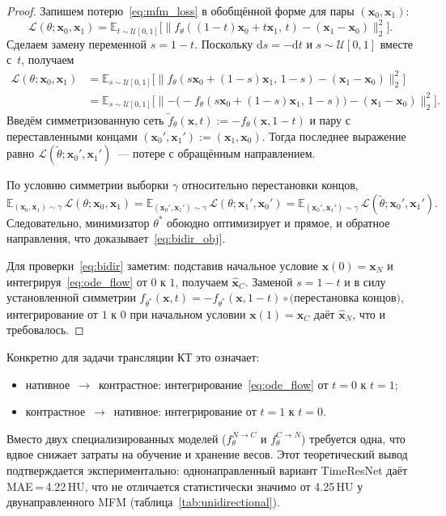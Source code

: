 \begin{proof}
Запишем потерю~\eqref{eq:mfm_loss} в обобщённой форме для пары $(\mathbf{x}_0,\mathbf{x}_1)$:
\[
    \mathcal{L}(\theta;\mathbf{x}_0,\mathbf{x}_1) = \mathbb{E}_{t\sim\mathcal{U}[0,1]}\bigl[\lVert f_\theta((1-t)\mathbf{x}_0+t\mathbf{x}_1,\,t)-(\mathbf{x}_1-\mathbf{x}_0)\rVert_2^2\bigr].
\]
Сделаем замену переменной $s=1-t$. Поскольку $\mathrm{d}s=-\mathrm{d}t$ и $s\sim\mathcal{U}[0,1]$ вместе с~$t$, получаем
\begin{align*}
    \mathcal{L}(\theta;\mathbf{x}_0,\mathbf{x}_1)
    &= \mathbb{E}_{s\sim\mathcal{U}[0,1]}\bigl[\lVert f_\theta(s\mathbf{x}_0+(1-s)\mathbf{x}_1,\,1-s)-(\mathbf{x}_1-\mathbf{x}_0)\rVert_2^2\bigr]\\
    &= \mathbb{E}_{s\sim\mathcal{U}[0,1]}\bigl[\lVert -\bigl(-f_\theta(s\mathbf{x}_0+(1-s)\mathbf{x}_1,\,1-s)\bigr)-(\mathbf{x}_1-\mathbf{x}_0)\rVert_2^2\bigr].
\end{align*}
Введём симметризованную сеть $\tilde f_\theta(\mathbf{x},t):=-f_\theta(\mathbf{x},1-t)$ и пару с переставленными концами $(\mathbf{x}_0',\mathbf{x}_1'):=(\mathbf{x}_1,\mathbf{x}_0)$. Тогда последнее выражение равно $\mathcal{L}(\tilde\theta;\mathbf{x}_0',\mathbf{x}_1')$~--- потере с обращённым направлением.

По условию симметрии выборки $\gamma$ относительно перестановки концов,
\[
    \mathbb{E}_{(\mathbf{x}_0,\mathbf{x}_1)\sim\gamma}\,\mathcal{L}(\theta;\mathbf{x}_0,\mathbf{x}_1)
    = \mathbb{E}_{(\mathbf{x}_0',\mathbf{x}_1')\sim\gamma}\,\mathcal{L}(\theta;\mathbf{x}_1',\mathbf{x}_0')
    = \mathbb{E}_{(\mathbf{x}_0',\mathbf{x}_1')\sim\gamma}\,\mathcal{L}(\tilde\theta;\mathbf{x}_0',\mathbf{x}_1').
\]
Следовательно, минимизатор $\theta^*$ обоюдно оптимизирует и прямое, и обратное направления, что доказывает~\eqref{eq:bidir_obj}.

Для проверки~\eqref{eq:bidir} заметим: подставив начальное условие $\mathbf{x}(0)=\mathbf{x}_N$ и интегрируя~\eqref{eq:ode_flow} от $0$ к $1$, получаем $\hat{\mathbf{x}}_C$. Заменой $s=1-t$ и в силу установленной симметрии $f_{\theta^*}(\mathbf{x},t)=-f_{\theta^*}(\mathbf{x},1-t)\circ\text{(перестановка концов)}$, интегрирование от $1$ к $0$ при начальном условии $\mathbf{x}(1)=\mathbf{x}_C$ даёт $\hat{\mathbf{x}}_N$, что и требовалось.
\end{proof}

Конкретно для задачи трансляции КТ это означает:
\begin{itemize}
    \item нативное~$\to$~контрастное: интегрирование~\eqref{eq:ode_flow} от $t=0$ к $t=1$;
    \item контрастное~$\to$~нативное: интегрирование от $t=1$ к $t=0$.
\end{itemize}
Вместо двух специализированных моделей ($f_\theta^{N\to C}$ и $f_\theta^{C\to N}$) требуется одна, что вдвое снижает затраты на обучение и хранение весов. Этот теоретический вывод подтверждается экспериментально: однонаправленный вариант TimeResNet даёт MAE\,=\,4.22\,HU, что не отличается статистически значимо от 4.25\,HU у двунаправленного MFM (таблица~\ref{tab:unidirectional}).

